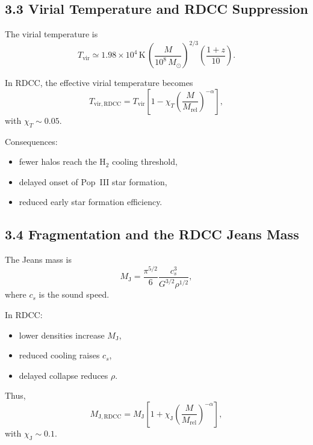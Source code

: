 \documentclass[11pt,a4paper]{article}
\begin{document}
\subsection*{3.3 Virial Temperature and RDCC Suppression}

The virial temperature is
\begin{equation}
    T_{\mathrm{vir}}
    \simeq 1.98 \times 10^4\,\mathrm{K}\,
    \left(\frac{M}{10^8\,M_{\odot}}\right)^{2/3}
    \left(\frac{1+z}{10}\right).
\end{equation}

In RDCC, the effective virial temperature becomes
\begin{equation}
    T_{\mathrm{vir,RDCC}}
    = T_{\mathrm{vir}}
      \left[
        1 - \chi_{T}
        \left(\frac{M}{M_{\mathrm{rel}}}\right)^{-\alpha}
      \right],
\end{equation}
with $\chi_{T} \sim 0.05$.

Consequences:

\begin{itemize}
    \item fewer halos reach the $\mathrm{H}_2$ cooling threshold,
    \item delayed onset of Pop~III star formation,
    \item reduced early star formation efficiency.
\end{itemize}

\subsection*{3.4 Fragmentation and the RDCC Jeans Mass}

The Jeans mass is
\begin{equation}
    M_{\mathrm{J}}
    = \frac{\pi^{5/2}}{6}
      \frac{c_s^3}{G^{3/2} \rho^{1/2}},
\end{equation}
where $c_s$ is the sound speed.

In RDCC:

\begin{itemize}
    \item lower densities increase $M_{\mathrm{J}}$,
    \item reduced cooling raises $c_s$,
    \item delayed collapse reduces $\rho$.
\end{itemize}

Thus,
\begin{equation}
    M_{\mathrm{J,RDCC}}
    = M_{\mathrm{J}}
      \left[
        1 + \chi_{\mathrm{J}}
        \left(\frac{M}{M_{\mathrm{rel}}}\right)^{-\alpha}
      \right],
\end{equation}
with $\chi_{\mathrm{J}} \sim 0.1$.
\end{document}
